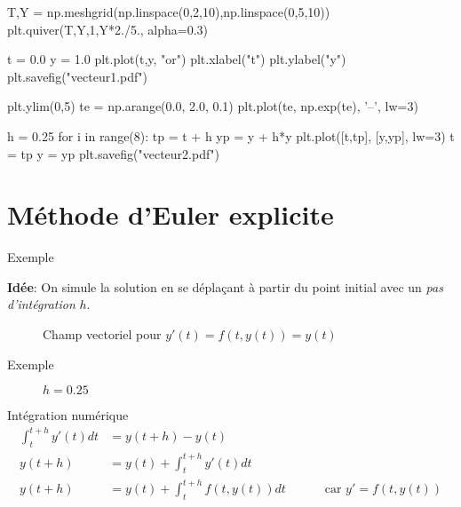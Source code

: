 \documentclass{beamer}
\begin{document}
\begin{pycode}
    T,Y = np.meshgrid(np.linspace(0,2,10),np.linspace(0,5,10))
    plt.quiver(T,Y,1,Y*2./5., alpha=0.3)

    t = 0.0
    y = 1.0
    plt.plot(t,y, "or")
    plt.xlabel("t")
    plt.ylabel("y")
    plt.savefig("vecteur1.pdf")

    plt.ylim(0,5)
    te = np.arange(0.0, 2.0, 0.1)
    plt.plot(te, np.exp(te), '--', lw=3)

    h = 0.25
    for i in range(8):
        tp = t + h
        yp = y + h*y
        plt.plot([t,tp], [y,yp], lw=3)
        t = tp
        y = yp
    plt.savefig("vecteur2.pdf")
\end{pycode}

\section{Méthode d'Euler explicite}

\begin{frame}{Exemple}

    \textbf{Idée}: On simule la solution en se déplaçant à partir du point initial avec un \emph{pas d'intégration} $h$.

    \begin{figure}
        \caption{Champ vectoriel pour $y'(t)= f(t,y(t)) = y(t)$}
    \end{figure}
\end{frame}

\begin{frame}{Exemple}
    \begin{figure}
        \caption{$h=0.25$}
    \end{figure}
\end{frame}


\begin{frame}{Intégration numérique}
    \begin{align*}
        \int_t^{t+h} y'(t) dt & = y(t+h) - y(t)                    &                                     \\
        y(t+h)                & = y(t) + \int_t^{t+h} y'(t) dt     &                                     \\
        y(t+h)                & = y(t) + \int_t^{t+h} f(t,y(t)) dt & \qquad \text{ car } y' = f(t, y(t)) \\
    \end{align*}
\end{frame}
\end{document}
